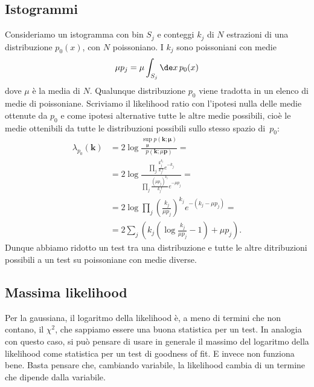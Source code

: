 
\subsection{Istogrammi}

Consideriamo un istogramma con bin $S_j$ e conteggi $k_j$
di $N$ estrazioni di una distribuzione $p_0(x)$,
con $N$ poissoniano.
I $k_j$ sono poissoniani con medie
\begin{equation*}
	\mu p_j = \mu \int_{S_j} \de x\, p_0(x)
\end{equation*}
dove $\mu$ è la media di $N$.
Qualunque distribuzione $p_0$ viene tradotta in un elenco di medie di poissoniane.
Scriviamo il likelihood ratio con l'ipotesi nulla delle medie ottenute da $p_0$
e come ipotesi alternative tutte le altre medie possibili,
cioè le medie ottenibili da tutte le distribuzioni possibili sullo stesso spazio di~$p_0$:
\begin{align*}
	\lambda_{p_0}(\mathbf k)
	&= 2\log \frac
	{\sup\limits_{\boldsymbol\mu} p(\mathbf k;\boldsymbol\mu)}
	{p(\mathbf k;\mu \mathbf p)} = \\
	&= 2\log \frac
	{\prod_j \frac {k_j^{k_j}} {k_j!} e^{-k_j}}
	{\prod_j \frac {(\mu p_j)^{k_j}} {k_j!} e^{-\mu p_j}} = \\
	&= 2\log \prod_j \left(\frac{k_j}{\mu p_j}\right)^{k_j} e^{-(k_j-\mu p_j)} = \\
	&= 2\sum_j \left( k_j\left(\log\frac{k_j}{\mu p_j}-1\right) + \mu p_j \right).
\end{align*}
Dunque abbiamo ridotto un test tra una distribuzione e tutte le altre ditribuzioni possibili
a un test su poissoniane con medie diverse.

\subsection{Massima likelihood}

Per la gaussiana,
il logaritmo della likelihood è, a meno di termini che non contano, il $\chi^2$,
che sappiamo essere una buona statistica per un test.
In analogia con questo caso,
si può pensare di usare in generale il massimo del logaritmo della likelihood
come statistica per un test di goodness of fit.
E invece non funziona bene.
Basta pensare che, cambiando variabile,
la likelihood cambia di un termine che dipende dalla variabile.


